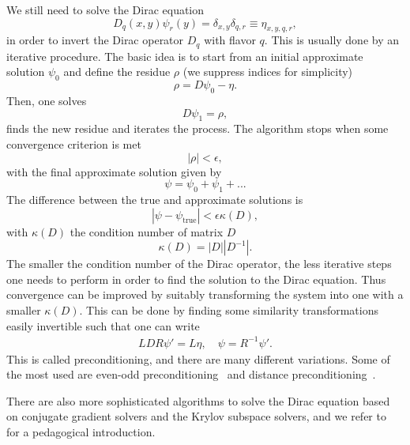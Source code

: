 We still need to solve the Dirac equation
\begin{equation}
D_q(x,y)\psi_r(y)=\delta_{x,y}\delta_{q,r}\equiv\eta_{x,y,q,r},
\end{equation}
in order to invert the Dirac operator $D_q$ with flavor $q$. This is usually done by an iterative procedure. The basic idea is to start from an initial approximate solution $\psi_0$ and define the residue $\rho$ (we suppress indices for simplicity)
\begin{equation}
\rho=D\psi_0-\eta.
\end{equation}
Then, one solves
\begin{equation}
D\psi_1=\rho,
\end{equation}
finds the new residue and iterates the process. The algorithm stops when some convergence criterion is met
\begin{equation}
|\rho|<\epsilon,
\end{equation}
with the final approximate solution given by
\begin{equation}
\psi=\psi_0+\psi_1+...
\end{equation}
The difference between the true and approximate solutions is
\begin{equation}
|\psi-\psi_{\textrm{true}}|<\epsilon\kappa(D),
\end{equation}
with $\kappa(D)$ the condition number of matrix $D$
\begin{equation}
\kappa(D)=|D||D^{-1}|.
\end{equation}
The smaller the condition number of the Dirac operator, the less iterative steps one needs to perform in order to find the solution to the Dirac equation. Thus convergence can be improved by suitably transforming the system into one with a smaller $\kappa(D)$. This can be done by finding some similarity transformations easily invertible such that one can write
\begin{gather}
LDR\psi'=L\eta, \quad \psi=R^{-1}\psi'.
\end{gather}
This is called preconditioning, and there are many different variations. Some of the most used are even-odd preconditioning~\citep{DEGRAND1988161} and distance preconditioning~\citep{deDivitiis:2010ya}.

There are also more sophisticated algorithms to solve the Dirac equation based on conjugate gradient solvers and the Krylov subspace solvers, and we refer to ~\citep{Gattringer_Lang_2010} for a pedagogical introduction.



